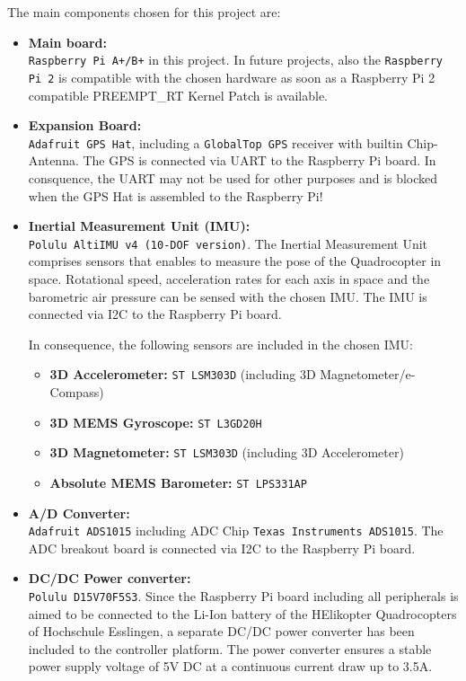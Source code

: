 The main components chosen for this project are:
\begin{itemize}
	\item \textbf{Main board:}\\
	\texttt{Raspberry Pi A+/B+} in this project. In future projects, also the \texttt{Raspberry Pi 2} is compatible with the chosen hardware as soon as a Raspberry Pi 2 compatible PREEMPT\_RT Kernel Patch is available.
	
	\item \textbf{Expansion Board:}\\
	\texttt{Adafruit GPS Hat}, including a \texttt{GlobalTop GPS} receiver with builtin Chip-Antenna. The GPS is connected via UART to the Raspberry Pi board. In consquence, the UART may not be used for other purposes and is blocked when the GPS Hat is assembled to the Raspberry Pi!
	
	\item \textbf{Inertial Measurement Unit (IMU):}\\
	\texttt{Polulu AltiIMU v4 (10-DOF version)}. The Inertial Measurement Unit comprises sensors that enables to measure the pose of the Quadrocopter in space. Rotational speed, acceleration rates for each axis in space and the barometric air pressure can be sensed with the chosen IMU. The IMU is connected via I2C to the Raspberry Pi board.
	
	In consequence, the following sensors are included in the chosen IMU:
	\begin{itemize}
		\item \textbf{3D Accelerometer:} \texttt{ST LSM303D} (including 3D Magnetometer/e-Compass)
		\item \textbf{3D MEMS Gyroscope:} \texttt{ST L3GD20H}
		\item \textbf{3D Magnetometer:} \texttt{ST LSM303D} (including 3D Accelerometer)
		\item \textbf{Absolute MEMS Barometer:} \texttt{ST LPS331AP}
	\end{itemize}
	
	\item \textbf{A/D Converter:}\\
	\texttt{Adafruit ADS1015} including ADC Chip \texttt{Texas Instruments ADS1015}. The ADC breakout board is connected via I2C to the Raspberry Pi board.
	
	\item \textbf{DC/DC Power converter:}\\
	\texttt{Polulu D15V70F5S3}. Since the Raspberry Pi board including all peripherals is aimed to be connected to the Li-Ion battery of the HElikopter Quadrocopters of Hochschule Esslingen, a separate DC/DC power converter has been included to the controller platform. The power converter ensures a stable power supply voltage of 5V DC at a continuous current draw up to 3.5A.
\end{itemize}

